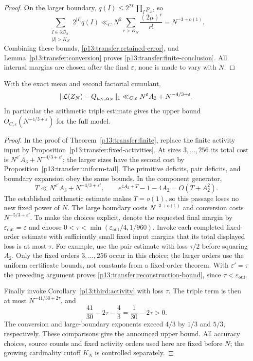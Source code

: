 \begin{proof}
On the larger boundary, $q(I)\leq2^{2L}\prod_Ip_x$, so
\[
 \sum_{\substack{I\in\partial\mathscr D_2\\|I|>K_N}}2^{|I|}q(I)
 \ll_C N^2\sum_{r>K_N}\frac{(2\mu)^r}{r!}=N^{-3+o(1)}.
\]
Combining these bounds, \eqref{p13:transfer:retained-error}, and
Lemma~\ref{p13:transfer:conversion} proves
\eqref{p13:transfer:finite-conclusion}. All internal margins are chosen
after the final $\varepsilon$; none is made to vary with $N$.
\end{proof}

\begin{theorem}
\label{p13:transfer:reconstruction}
With the exact mean and second factorial cumulant,
\begin{equation}
 \|\mathcal L(Z_N)-Q_{\mu_N,\alpha_N}\|_1
       \ll_{C,\varepsilon}N^\varepsilon A_3+N^{-4/3+\varepsilon}.
 \label{p13:transfer:reconstruction-bound}
\end{equation}
In particular the arithmetic triple estimate gives the upper bound
$O_{C,\varepsilon}(N^{-4/3+\varepsilon})$ for the full model.
\end{theorem}

\begin{proof}
In the proof of Theorem~\ref{p13:transfer:finite}, replace the finite
activity input by Proposition~\ref{p13:transfer:fixed-activities}.
At sizes $3,\ldots,256$ its total cost is
$N^{\varepsilon'}A_3+N^{-4/3+\varepsilon'}$; the larger sizes have the
second cost by Proposition~\ref{p13:transfer:uniform-tail}.
The primitive deficits, pair deficits, and boundary expansion obey
the same bounds. In the component generator,
\[
 T\ll N^{\varepsilon'}A_3+N^{-4/3+\varepsilon'},\qquad
 e^{4A_2+T}-1-4A_2=O(T+A_2^2).
\]
The established arithmetic estimate makes $T=o(1)$, so this passage
loses no new fixed power of $N$. The large boundary costs $N^{-3+o(1)}$
and conversion costs $N^{-5/3+\varepsilon'}$.
To make the choices explicit, denote the requested final margin by
$\varepsilon_{\mathrm{out}}=\varepsilon$ and choose
$0<\tau<\min(\varepsilon_{\mathrm{out}}/4,1/960)$.
Invoke each completed fixed-order estimate with sufficiently small fixed
input margins that its total displayed loss is at most $\tau$.
For example, use the pair estimate with loss $\tau/2$ before squaring
$A_2$. Only the fixed orders $3,\ldots,256$ occur in this choice;
the larger orders use the uniform certificate bounds, not constants
from a fixed-order theorem. With $\varepsilon'=\tau$ the preceding
argument proves \eqref{p13:transfer:reconstruction-bound}, since
$\tau<\varepsilon_{\mathrm{out}}$.

Finally invoke Corollary~\ref{p13:third:activity} with loss $\tau$.
The triple term is then at most $N^{-41/30+2\tau}$, and
\[
 \frac{41}{30}-2\tau-\frac43=\frac1{30}-2\tau>0.
\]
The conversion and large-boundary exponents exceed $4/3$ by $1/3$
and $5/3$, respectively. These comparisons give the announced upper
bound. All accuracy choices, source counts and fixed activity orders used here
are fixed before $N$; the growing cardinality cutoff $K_N$ is controlled
separately.
\end{proof}

